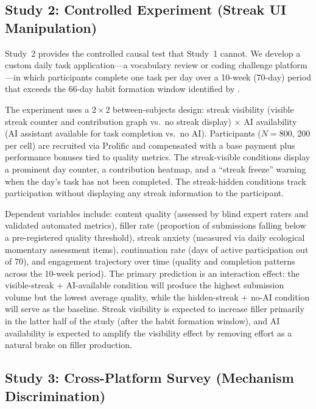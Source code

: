 \documentclass[12pt]{article}
\begin{document}
\subsection{Study 2: Controlled Experiment (Streak UI Manipulation)}
\label{sec:study2}

Study~2 provides the controlled causal test that Study~1 cannot. We develop a custom daily task application---a vocabulary review or coding challenge platform---in which participants complete one task per day over a 10-week (70-day) period that exceeds the 66-day habit formation window identified by \citet{Lally2010}.

The experiment uses a $2 \times 2$ between-subjects design: streak visibility (visible streak counter and contribution graph vs.\ no streak display) $\times$ AI availability (AI assistant available for task completion vs.\ no AI). Participants ($N = 800$, 200 per cell) are recruited via Prolific and compensated with a base payment plus performance bonuses tied to quality metrics. The streak-visible conditions display a prominent day counter, a contribution heatmap, and a ``streak freeze'' warning when the day's task has not been completed. The streak-hidden conditions track participation without displaying any streak information to the participant.

Dependent variables include: content quality (assessed by blind expert raters and validated automated metrics), filler rate (proportion of submissions falling below a pre-registered quality threshold), streak anxiety (measured via daily ecological momentary assessment items), continuation rate (days of active participation out of 70), and engagement trajectory over time (quality and completion patterns across the 10-week period). The primary prediction is an interaction effect: the visible-streak + AI-available condition will produce the highest submission volume but the lowest average quality, while the hidden-streak + no-AI condition will serve as the baseline. Streak visibility is expected to increase filler primarily in the latter half of the study (after the habit formation window), and AI availability is expected to amplify the visibility effect by removing effort as a natural brake on filler production.

\subsection{Study 3: Cross-Platform Survey (Mechanism Discrimination)}
\label{sec:study3}
\end{document}
